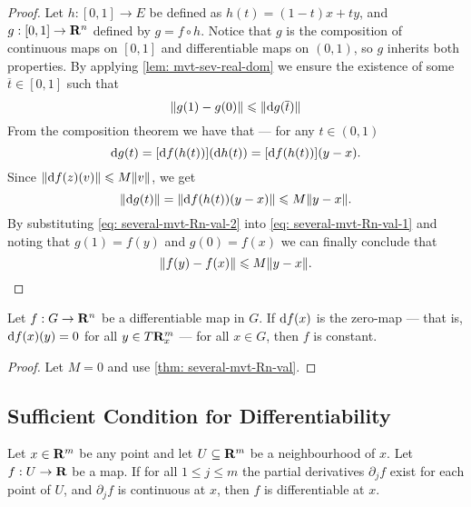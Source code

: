 \begin{proof}
  Let \(h: [0, 1] \to E\) be defined as \(h(t) = (1-t)x + ty\), and \(g: [0, 1]
  \to \mathbf{R}^n\) defined by \(g = f \circ h\). Notice that \(g\) is the composition
  of continuous maps on \([0, 1]\) and differentiable maps on \((0, 1)\), so
  \(g\) inherits both properties. By applying \cref{lem: mvt-sev-real-dom} we
  ensure the existence of some \(\overline t \in [0, 1]\) such that
  \begin{equation}\label{eq: several-mvt-Rn-val-1}
    \lVert g(1) - g(0)\rVert \leqslant \lVert\mathrm{d} g(\overline t)\rVert
  \end{equation}
  From the composition theorem we have that --- for any \(t \in (0, 1)\)
  \[
    \mathrm{d} g(t) = [\mathrm{d} f(h(t))](\mathrm{d} h(t)) = [\mathrm{d} f(h(t))](y - x).
  \]
  Since \(\lVert\mathrm{d} f(z)(v)\rVert \leqslant M \lVert v\rVert\), we get
  \begin{equation}\label{eq: several-mvt-Rn-val-2}
    \lVert\mathrm{d} g(t)\rVert
    = \lVert\mathrm{d} f(h(t))(y - x)\rVert
    \leqslant M \lVert y - x\rVert.
  \end{equation}
  By substituting \cref{eq: several-mvt-Rn-val-2} into \cref{eq:
  several-mvt-Rn-val-1} and noting that \(g(1) = f(y)\) and \(g(0) = f(x)\) we
  can finally conclude that
  \[
    \lVert f(y) - f(x)\rVert \leqslant M \lVert y - x\rVert.
  \]
\end{proof}

\begin{corollary}
  Let \(f: G \to \mathbf{R}^n\) be a differentiable map in \(G\). If \(\mathrm{d} f(x)\) is
  the zero-map --- that is, \(\mathrm{d} f(x)(y) = 0\) for all \(y \in T\mathbf{R}^m_x\) ---
  for all \(x \in G\), then \(f\) is constant.
\end{corollary}

\begin{proof}
  Let \(M = 0\) and use \cref{thm: several-mvt-Rn-val}.
\end{proof}

\subsection{Sufficient Condition for Differentiability}

\begin{theorem}\label{thm: suff-partial-continuous}
  Let \(x \in \mathbf{R}^m\) be any point and let \(U \subseteq \mathbf{R}^m\) be a
  neighbourhood of \(x\). Let \(f: U \to \mathbf{R}\) be a map. If for all \(1 \leq j
  \leq m\) the partial derivatives \(\partial_j f\) exist for each point of
  \(U\), and \(\partial_j f\) is continuous at \(x\), then \(f\) is
  differentiable at \(x\).
\end{theorem}

